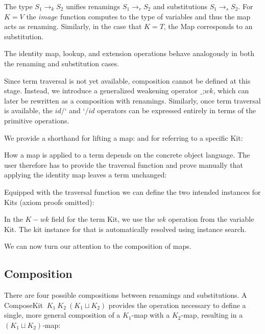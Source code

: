 \documentclass[screen,nonacm]{acmart}
\begin{document}
The type $S_1 \to_k S_2$ unifies renamings $S_1 \to_r S_2$ and substitutions
$S_1 \to_s S_2$. For $K = V$ the $image$ function computes to the type of
variables and thus the map acts as renaming. Similarly, in the case that $K =
      T$, the Map corresponds to an substitution.

The identity map, lookup, and extension operations behave analogously in both
the renaming and substitution cases.

Since term traversal is not yet available, composition cannot be defined at
this stage. Instead, we introduce a generalized weakening operator $\_;wk$,
which can later be rewritten as a composition with renamings. Similarly, once
term traversal is available, the $id/‘$ and $‘/id$ operators can be expressed
entirely in terms of the primitive operations.

We provide a shorthand for lifting a map:\ALifting{} and for referring to a
specific Kit: \AKitExplicit{}

How a map is applied to a term depends on the concrete object language. The
user therefore has to provide the traversal function and prove manually that
applying the identity map leaves a term unchanged: \ATraversal{}

Equipped with the traversal function we can define the two intended instances
for Kits (axiom proofs omitted):

\begin{minipage}[t]{0.48\linewidth}
      \raggedright{}
      \AInstanceRen{}
\end{minipage}
\begin{minipage}[t]{0.48\linewidth}
      \raggedright{}
      \AInstanceSub{}
\end{minipage}

In the $K-wk$ field for the term Kit, we use the $wk$ operation from the
variable Kit. The kit instance for that is automatically resolved using
instance search.

We can now turn our attention to the composition of maps.

\subsection{Composition}\label{sec:ags-com}
There are four possible compositions between renamings and substitutions. A
ComposeKit $\ K_1\ K_2\ (K_1 \sqcup K_2)$ provides the operation necessary to
define a single, more general composition of a $K_1$-map with a $K_2$-map,
resulting in a $(K_1 \sqcup K_2)$-map: \AComposeKit
\end{document}
